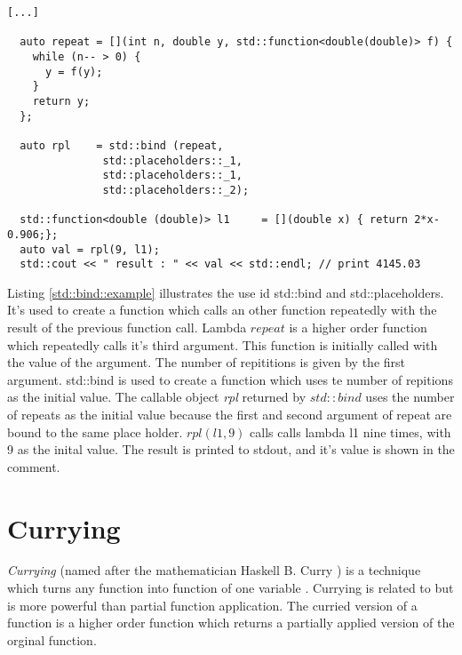 \documentclass[12pt,fleqn]{article}
\begin{document}
\begin{lstlisting}[caption=std::bind example, label=std::bind::example]
[...]
 
  auto repeat = [](int n, double y, std::function<double(double)> f) { 
    while (n-- > 0) {
      y = f(y);
    }
    return y;
  };

  auto rpl    = std::bind (repeat,
			   std::placeholders::_1,
			   std::placeholders::_1,
			   std::placeholders::_2);

  std::function<double (double)> l1     = [](double x) { return 2*x-0.906;};
  auto val = rpl(9, l1);
  std::cout << " result : " << val << std::endl; // print 4145.03

\end{lstlisting}
Listing \ref{std::bind::example} illustrates the use id std::bind and std::placeholders.
It's used to create a function which calls an other function repeatedly with the result of the previous function call.
Lambda $repeat$ is a higher order function which repeatedly calls it's third argument. 
This function is initially called with the value of the  argument.
The number of repititions is given by the first argument. 
std::bind is used to create a function which uses te number of repitions as the initial value.
The callable object {\em rpl} returned by $std::bind$ uses the number of repeats as the initial value because the first and second argument of repeat are bound to the same place holder. 
$rpl(l1,9)$ calls calls lambda l1 nine times, with 9 as the inital value. 
The result is printed to stdout, and it's value is shown in the comment.
\section*{Currying}
{\em Currying} (named after the mathematician Haskell B. Curry ) is a technique which turns any function into function of one variable \cite{field}.
Currying is related to but is more powerful than partial function application.
The curried version of a function is a higher order function which returns a partially applied version of the orginal function.
\end{document}
